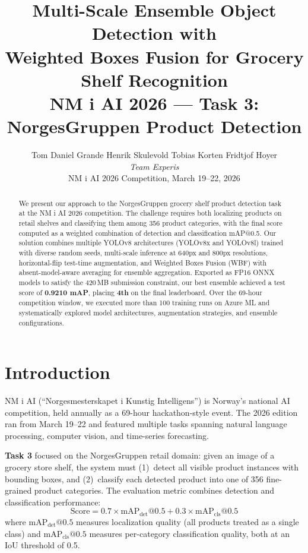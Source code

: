 \documentclass[11pt,a4paper]{article}
\title{%
    \textbf{Multi-Scale Ensemble Object Detection with\\
    Weighted Boxes Fusion for Grocery Shelf Recognition}\\[0.5em]
    \large NM i AI 2026 --- Task 3: NorgesGruppen Product Detection
}
\author{
    Tom Daniel Grande \quad Henrik Skulevold \quad Tobias Korten \quad Fridtjof Hoyer\\[0.3em]
    \textit{Team Experis}\\[0.2em]
    \small NM i AI 2026 Competition, March 19--22, 2026
}
\date{}
\begin{document}
\maketitle

\begin{abstract}
We present our approach to the NorgesGruppen grocery shelf product detection task at the NM i AI 2026 competition.
The challenge requires both localizing products on retail shelves and classifying them among 356 product categories, with the final score computed as a weighted combination of detection and classification mAP@0.5.
Our solution combines multiple YOLOv8 architectures (YOLOv8x and YOLOv8l) trained with diverse random seeds, multi-scale inference at 640px and 800px resolutions, horizontal-flip test-time augmentation, and Weighted Boxes Fusion (WBF) with absent-model-aware averaging for ensemble aggregation.
Exported as FP16 ONNX models to satisfy the 420\,MB submission constraint, our best ensemble achieved a test score of \textbf{0.9210 mAP}, placing \textbf{4th} on the final leaderboard.
Over the 69-hour competition window, we executed more than 100 training runs on Azure ML and systematically explored model architectures, augmentation strategies, and ensemble configurations.
\end{abstract}

\section{Introduction}
\label{sec:intro}

NM i AI (``Norgesmesterskapet i Kunstig Intelligens'') is Norway's national AI competition, held annually as a 69-hour hackathon-style event.
The 2026 edition ran from March 19--22 and featured multiple tasks spanning natural language processing, computer vision, and time-series forecasting.

\textbf{Task 3} focused on the NorgesGruppen retail domain: given an image of a grocery store shelf, the system must (1)~detect all visible product instances with bounding boxes, and (2)~classify each detected product into one of 356 fine-grained product categories.
The evaluation metric combines detection and classification performance:
\begin{equation}
    \text{Score} = 0.7 \times \text{mAP}_{\text{det}}@0.5 + 0.3 \times \text{mAP}_{\text{cls}}@0.5
    \label{eq:score}
\end{equation}
where $\text{mAP}_{\text{det}}@0.5$ measures localization quality (all products treated as a single class) and $\text{mAP}_{\text{cls}}@0.5$ measures per-category classification quality, both at an IoU threshold of 0.5.
\end{document}
